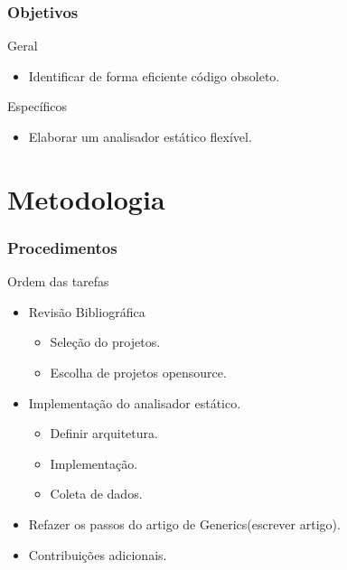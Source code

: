 \documentclass[]{beamer}
\begin{document}
	
	\begin{frame}[fragile]\frametitle{Objetivos}
		\begin{block}{Geral}
			\begin{itemize}
				\item Identificar de forma eficiente código obsoleto.
			\end{itemize}
		\end{block}
			
			\begin{block}{Específicos}
				\begin{itemize}
					\item Elaborar um analisador estático flexível.
				\end{itemize}
			\end{block}
	\end{frame}
	
	\section{Metodologia}
	\begin{frame}[label=metodologia, fragile]
		\frametitle{Procedimentos}
		\begin{block}{Ordem das tarefas}
			\begin{itemize}
				\item Revisão Bibliográfica
					\begin{itemize}
						\item Seleção do projetos.
						\item Escolha de projetos opensource.
					\end{itemize}
				\item Implementação do analisador estático.
					\begin{itemize}
						\item Definir arquitetura.
						\item Implementação.
						\item Coleta de dados.
					\end{itemize}
				\item Refazer os passos do artigo de Generics(escrever artigo).
				
				\item Contribuições adicionais.
			\end{itemize}
		\end{block}
	\end{frame}
	
\end{document}
